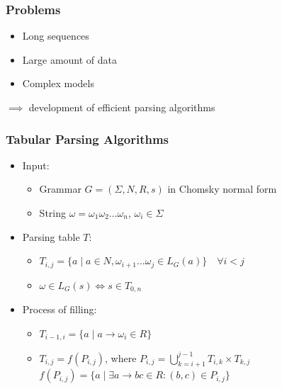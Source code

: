 \documentclass[xcolor=table]{beamer}
\begin{document}
\begin{frame}[fragile] \frametitle{Problems}

    \begin{itemize}
        \item Long sequences
        \item Large amount of data
        \item Complex models
        \hspace{20pt}
    \end{itemize} 
    $\implies$ development of efficient parsing algorithms

\end{frame}



\begin{frame}[fragile] \frametitle{Tabular Parsing Algorithms}

\begin{itemize}
    \item Input:
    \begin{itemize}
        \item Grammar $G = (\Sigma, N, R, s)$ in Chomsky normal form
        \item String $\omega = \omega_{1}\omega_{2} \dots \omega_{n}$, $\omega_i \in \Sigma$
    \end{itemize}
    \item Parsing table $T$:
        \begin{itemize}
            \item $T_{i, j} =  \{ a \mid a \in N, \omega_{i + 1} \dots \omega_{j} \in L_{G}(a)\} \quad \forall i < j$
            \item $\omega \in L_{G}(s) \iff s \in T_{0, n}$
        \end{itemize}
    \pause
    \item Process of filling:
        \begin{itemize}
            \item $T_{i - 1, i} = \{ a \mid a \rightarrow \omega_{i} \in R\}$
            \vspace{5pt}
            \item $T_{i, j} = f(P_{i, j})$, where $P_{i, j} = \bigcup\limits_{k = i + 1}^{j - 1} T_{i,k} \times T_{k, j}$ \\ 
            \hspace{85pt} $f(P_{i, j}) = \{a \mid \exists a \rightarrow bc \in R : (b, c) \in P_{i, j}\}$
        \end{itemize}
    \end{itemize}
\end{frame}
\end{document}
